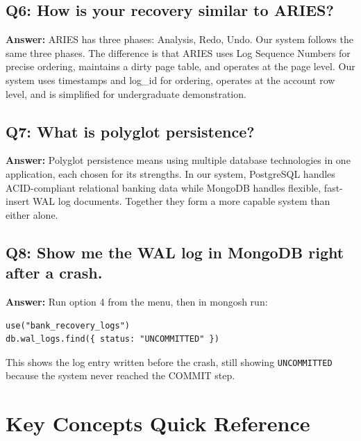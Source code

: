 \subsection{Q6: How is your recovery similar to ARIES?}

\textbf{Answer:} ARIES has three phases: Analysis, Redo, Undo. Our system
follows the same three phases. The difference is that ARIES uses Log Sequence
Numbers for precise ordering, maintains a dirty page table, and operates at
the page level. Our system uses timestamps and log\_id for ordering, operates
at the account row level, and is simplified for undergraduate demonstration.

\subsection{Q7: What is polyglot persistence?}

\textbf{Answer:} Polyglot persistence means using multiple database
technologies in one application, each chosen for its strengths. In our
system, PostgreSQL handles ACID-compliant relational banking data while
MongoDB handles flexible, fast-insert WAL log documents. Together they form
a more capable system than either alone.

\subsection{Q8: Show me the WAL log in MongoDB right after a crash.}

\textbf{Answer:} Run option 4 from the menu, then in mongosh run:
\begin{lstlisting}[style=jsonstyle]
use("bank_recovery_logs")
db.wal_logs.find({ status: "UNCOMMITTED" })
\end{lstlisting}
This shows the log entry written before the crash, still showing
\texttt{UNCOMMITTED} because the system never reached the COMMIT step.

\section{Key Concepts Quick Reference}


